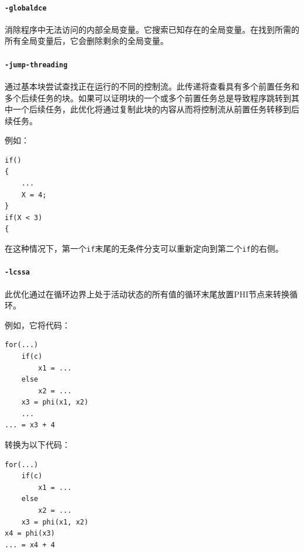 \documentclass[lang=cn,11pt,a4paper,cite=authornum]{paper}
\begin{document}
\paragraph{\texttt{-globaldce}}

消除程序中无法访问的内部全局变量。它搜索已知存在的全局变量。在找到所需的所有全局变量后，它会删除剩余的全局变量。

\paragraph{\texttt{-jump-threading}}

通过基本块尝试查找正在运行的不同的控制流。此传递将查看具有多个前置任务和多个后续任务的块。如果可以证明块的一个或多个前置任务总是导致程序跳转到其中一个后续任务，此优化将通过复制此块的内容从而将控制流从前置任务转移到后续任务。

例如：

\begin{code}
    \begin{verbatim}
if()
{
    ...
    X = 4;
}
if(X < 3)
{
\end{verbatim}
\end{code}

在这种情况下，第一个\texttt{if}末尾的无条件分支可以重新定向到第二个\texttt{if}的右侧。

\paragraph{\texttt{-lcssa}}

此优化通过在循环边界上处于活动状态的所有值的循环末尾放置PHI节点来转换循环。

例如，它将代码：

\begin{code}
    \begin{verbatim}
for(...)
    if(c)
        x1 = ...
    else
        x2 = ...
    x3 = phi(x1, x2)
    ...
... = x3 + 4
\end{verbatim}
\end{code}

转换为以下代码：

\begin{code}
    \begin{verbatim}
for(...)
    if(c)
        x1 = ...
    else
        x2 = ...
    x3 = phi(x1, x2)
x4 = phi(x3)
... = x4 + 4
\end{verbatim}
\end{code}
\end{document}
